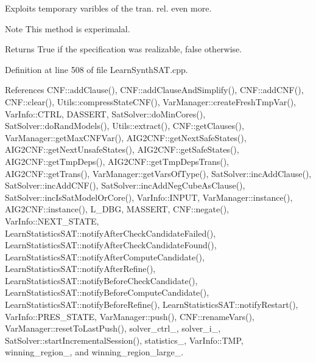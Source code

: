Exploits temporary varibles of the tran. rel. even more. 

\begin{DoxyNote}{Note}
This method is experimalal. 
\end{DoxyNote}
\begin{DoxyReturn}{Returns}
True if the specification was realizable, false otherwise. 
\end{DoxyReturn}


Definition at line 508 of file Learn\-Synth\-S\-A\-T.\-cpp.



References C\-N\-F\-::add\-Clause(), C\-N\-F\-::add\-Clause\-And\-Simplify(), C\-N\-F\-::add\-C\-N\-F(), C\-N\-F\-::clear(), Utils\-::compress\-State\-C\-N\-F(), Var\-Manager\-::create\-Fresh\-Tmp\-Var(), Var\-Info\-::\-C\-T\-R\-L, D\-A\-S\-S\-E\-R\-T, Sat\-Solver\-::do\-Min\-Cores(), Sat\-Solver\-::do\-Rand\-Models(), Utils\-::extract(), C\-N\-F\-::get\-Clauses(), Var\-Manager\-::get\-Max\-C\-N\-F\-Var(), A\-I\-G2\-C\-N\-F\-::get\-Next\-Safe\-States(), A\-I\-G2\-C\-N\-F\-::get\-Next\-Unsafe\-States(), A\-I\-G2\-C\-N\-F\-::get\-Safe\-States(), A\-I\-G2\-C\-N\-F\-::get\-Tmp\-Deps(), A\-I\-G2\-C\-N\-F\-::get\-Tmp\-Deps\-Trans(), A\-I\-G2\-C\-N\-F\-::get\-Trans(), Var\-Manager\-::get\-Vars\-Of\-Type(), Sat\-Solver\-::inc\-Add\-Clause(), Sat\-Solver\-::inc\-Add\-C\-N\-F(), Sat\-Solver\-::inc\-Add\-Neg\-Cube\-As\-Clause(), Sat\-Solver\-::inc\-Is\-Sat\-Model\-Or\-Core(), Var\-Info\-::\-I\-N\-P\-U\-T, Var\-Manager\-::instance(), A\-I\-G2\-C\-N\-F\-::instance(), L\-\_\-\-D\-B\-G, M\-A\-S\-S\-E\-R\-T, C\-N\-F\-::negate(), Var\-Info\-::\-N\-E\-X\-T\-\_\-\-S\-T\-A\-T\-E, Learn\-Statistics\-S\-A\-T\-::notify\-After\-Check\-Candidate\-Failed(), Learn\-Statistics\-S\-A\-T\-::notify\-After\-Check\-Candidate\-Found(), Learn\-Statistics\-S\-A\-T\-::notify\-After\-Compute\-Candidate(), Learn\-Statistics\-S\-A\-T\-::notify\-After\-Refine(), Learn\-Statistics\-S\-A\-T\-::notify\-Before\-Check\-Candidate(), Learn\-Statistics\-S\-A\-T\-::notify\-Before\-Compute\-Candidate(), Learn\-Statistics\-S\-A\-T\-::notify\-Before\-Refine(), Learn\-Statistics\-S\-A\-T\-::notify\-Restart(), Var\-Info\-::\-P\-R\-E\-S\-\_\-\-S\-T\-A\-T\-E, Var\-Manager\-::push(), C\-N\-F\-::rename\-Vars(), Var\-Manager\-::reset\-To\-Last\-Push(), solver\-\_\-ctrl\-\_\-, solver\-\_\-i\-\_\-, Sat\-Solver\-::start\-Incremental\-Session(), statistics\-\_\-, Var\-Info\-::\-T\-M\-P, winning\-\_\-region\-\_\-, and winning\-\_\-region\-\_\-large\-\_\-.


